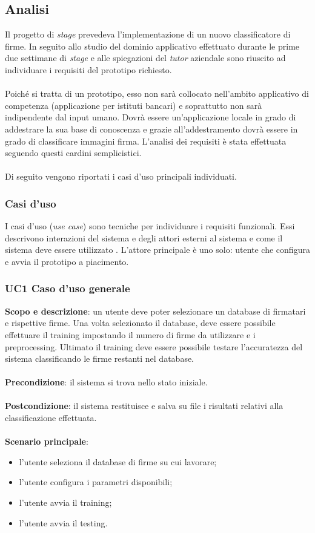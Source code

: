 \subsection{Analisi}
\label{3.2}

Il progetto di \emph{stage} prevedeva l'implementazione di un nuovo classificatore di firme. In seguito allo studio del dominio applicativo effettuato durante le prime due settimane di \emph{stage} e alle spiegazioni del \emph{tutor} aziendale sono riuscito ad individuare i requisiti del prototipo richiesto.\\\\
Poiché si tratta di un prototipo, esso non sarà collocato nell'ambito applicativo di competenza (applicazione per istituti bancari) e soprattutto non sarà indipendente dal input umano. Dovrà essere un'applicazione locale in grado di addestrare la sua base di conoscenza e grazie all'addestramento dovrà essere in grado di classificare immagini firma. L'analisi dei requisiti è stata effettuata seguendo questi cardini semplicistici.\\\\
Di seguito vengono riportati i casi d'uso principali individuati.
\subsubsection{Casi d'uso}
\label{3.2.1}
I casi d'uso (\emph{use case}) sono tecniche per individuare i requisiti funzionali. Essi descrivono interazioni del sistema e degli attori esterni al sistema e come il sistema deve essere utilizzato \cite{7}.
L'attore principale è uno solo: utente che configura e avvia il prototipo a piacimento.
\subsubsection*{UC1 Caso d'uso generale}
\label{3.2.1.1}
\textbf{Scopo e descrizione}: un utente deve poter selezionare un database di firmatari e rispettive firme. Una volta selezionato il database, deve essere possibile effettuare il training impostando il numero di firme da utilizzare e i preprocessing. Ultimato il training deve essere possibile testare l'accuratezza del sistema classificando le firme restanti nel database.\\\\
\textbf{Precondizione}: il sistema si trova nello stato iniziale.\\\\
\textbf{Postcondizione}: il sistema restituisce e salva su file i risultati relativi alla classificazione effettuata.\\\\
\textbf{Scenario principale}:
\begin{itemize}
\item l'utente seleziona il database di firme su cui lavorare;
\item l'utente configura i parametri disponibili;
\item l'utente avvia il training;
\item l'utente avvia il testing.
\end{itemize}

